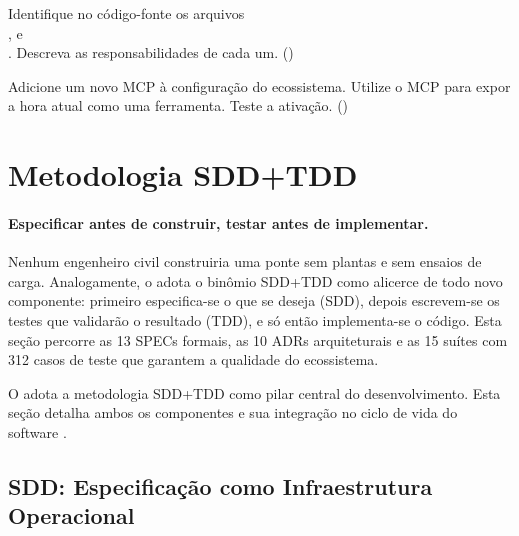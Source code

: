 \begin{exercicio}
Identifique no código-fonte os arquivos \\%
\hspace*{2em},
 e \\%
\hspace*{2em}. Descreva as
responsabilidades de cada um. (\nivelbasico)
\end{exercicio}

\begin{exercicio}
Adicione um novo MCP à configuração do ecossistema. Utilize o MCP
 para expor a hora atual como uma ferramenta. Teste a
ativação. (\nivelintermediario)
\end{exercicio}

\section{Metodologia SDD+TDD}
\label{sec:sdd-tdd}
\nivelintermediario

\paragraph{Especificar antes de construir, testar antes de implementar.} Nenhum engenheiro civil construiria uma ponte sem plantas e sem ensaios de carga. Analogamente, o \opencodeeco{} adota o binômio SDD+TDD como alicerce de todo novo componente: primeiro especifica-se o que se deseja (SDD), depois escrevem-se os testes que validarão o resultado (TDD), e só então implementa-se o código. Esta seção percorre as 13 SPECs formais, as 10 ADRs arquiteturais e as 15 suítes com 312 casos de teste que garantem a qualidade do ecossistema.

O \opencodeeco{} adota a metodologia SDD+TDD como pilar central do
desenvolvimento. Esta seção detalha ambos os componentes e sua
integração no ciclo de vida do software \cite{beck2002tdd,
sommerville2011engenharia, pressman2016engenharia}.

\subsection{SDD: Especificação como Infraestrutura Operacional}
\label{subsec:sdd}

